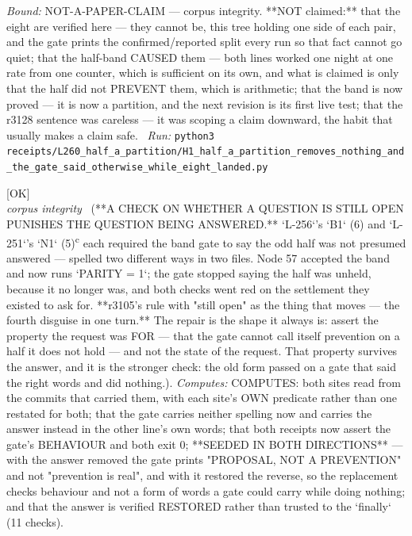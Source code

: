 \begin{description}
 \emph{Bound:} NOT-A-PAPER-CLAIM --- corpus integrity. **NOT claimed:** that the eight are verified here --- they cannot be, this tree holding one side of each pair, and the gate prints the confirmed/reported split every run so that fact cannot go quiet; that the half-band CAUSED them --- both lines worked one night at one rate from one counter, which is sufficient on its own, and what is claimed is only that the half did not PREVENT them, which is arithmetic; that the band is now proved --- it is now a partition, and the next revision is its first live test; that the r3128 sentence was careless --- it was scoping a claim downward, the habit that usually makes a claim safe.
\ \emph{Run:} \texttt{python3 receipts/L260\_half\_a\_partition/H1\_half\_a\_partition\_removes\_nothing\_and\_the\_gate\_said\_otherwise\_while\_eight\_landed.py}
\item[\label{rcpt:A1_a_check_on_whether_a_question_is_still_open_punishes_the_answer}\texttt{A1\_a\_check\_on\_whether\_a\_question\_is\_still\_open\_punishes\_the\_answer}]\hfill\textsf{[OK]}\\
\textit{corpus integrity} \ (**A CHECK ON WHETHER A QUESTION IS STILL OPEN PUNISHES THE QUESTION BEING ANSWERED.** `L-256`'s `B1` (6) and `L-251`'s `N1` (5)\textsuperscript{c} each required the band gate to say the odd half was not presumed answered --- spelled two different ways in two files. Node 57 accepted the band and now runs `PARITY = 1`; the gate stopped saying the half was unheld, because it no longer was, and both checks went red on the settlement they existed to ask for. **r3105's rule with "still open" as the thing that moves --- the fourth disguise in one turn.** The repair is the shape it always is: assert the property the request was FOR --- that the gate cannot call itself prevention on a half it does not hold --- and not the state of the request. That property survives the answer, and it is the stronger check: the old form passed on a gate that said the right words and did nothing.). 
\emph{Computes:} COMPUTES: both sites read from the commits that carried them, with each site's OWN predicate rather than one restated for both; that the gate carries neither spelling now and carries the answer instead in the other line's own words; that both receipts now assert the gate's BEHAVIOUR and both exit 0; **SEEDED IN BOTH DIRECTIONS** --- with the answer removed the gate prints "PROPOSAL, NOT A PREVENTION" and not "prevention is real", and with it restored the reverse, so the replacement checks behaviour and not a form of words a gate could carry while doing nothing; and that the answer is verified RESTORED rather than trusted to the `finally` (11 checks).

\end{description}

